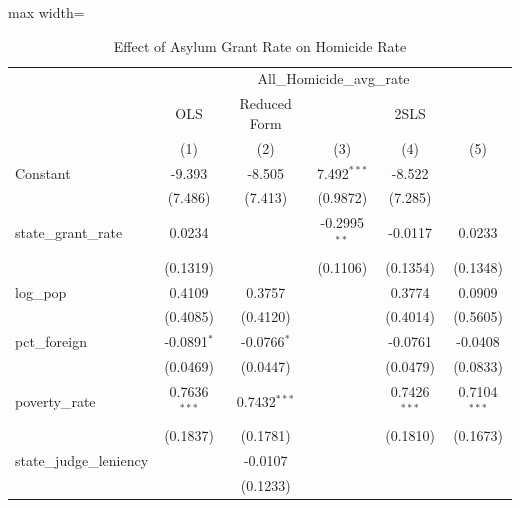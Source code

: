 \begin{table}[htbp]
   \caption{\label{tab:main} Effect of Asylum Grant Rate on Homicide Rate}
   \bigskip
   \centering
   \begin{adjustbox}{max width=\textwidth}
   \begin{tabular}{lccccc}
      \toprule
       & \multicolumn{5}{c}{All\_Homicide\_avg\_rate}\\
       & OLS & Reduced Form & \multicolumn{3}{c}{2SLS} \\ 
                                               & (1)            & (2)            & (3)            & (4)            & (5)\\  
      \midrule 
      Constant                                 & -9.393         & -8.505         & 7.492$^{***}$  & -8.522         &   \\   
                                               & (7.486)        & (7.413)        & (0.9872)       & (7.285)        &   \\   
      state\_grant\_rate                       & 0.0234         &                & -0.2995$^{**}$ & -0.0117        & 0.0233\\   
                                               & (0.1319)       &                & (0.1106)       & (0.1354)       & (0.1348)\\   
      log\_pop                                 & 0.4109         & 0.3757         &                & 0.3774         & 0.0909\\   
                                               & (0.4085)       & (0.4120)       &                & (0.4014)       & (0.5605)\\   
      pct\_foreign                             & -0.0891$^{*}$  & -0.0766$^{*}$  &                & -0.0761        & -0.0408\\   
                                               & (0.0469)       & (0.0447)       &                & (0.0479)       & (0.0833)\\   
      poverty\_rate                            & 0.7636$^{***}$ & 0.7432$^{***}$ &                & 0.7426$^{***}$ & 0.7104$^{***}$\\   
                                               & (0.1837)       & (0.1781)       &                & (0.1810)       & (0.1673)\\   
      state\_judge\_leniency                   &                & -0.0107        &                &                &   \\   
                                               &                & (0.1233)       &                &                &   \\   

\end{tabular}
\end{adjustbox}
\end{table}
